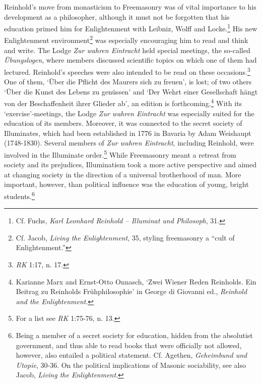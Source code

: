 Reinhold's move from monasticism to Freemasonry was of vital importance to his development as a philosopher, although it must not be forgotten that his education primed him for Enlightenment with Leibniz, Wolff and Locke.\footnote{ Cf. Fuchs, \textit{Karl Leonhard Reinhold {--} Illuminat und Philosoph}, 31.} His new Enlightenment environment\footnote{ Cf. Jacob, \textit{Living the Enlightenment}, 35, styling freemasonry a ``cult of Enlightenment.''} was especially encouraging him to read and think and write. The Lodge \textit{Zur wahren Eintracht} held special meetings, the so{-}called \textit{\"{U}bungslogen}, where members discussed scientific topics on which one of them had lectured. Reinhold's speeches were also intended to be read on these occasions.\footnote{ \textit{RK} 1:17, n. 17. } One of them, `\"{U}ber die Pflicht des Maurers sich zu freuen', is lost; of two others `\"{U}ber die Kunst des Lebens zu gen\"{u}ssen' and `Der Wehrt einer Gesellschaft h\"{a}ngt von der Beschaffenheit ihrer Glieder ab', an edition is forthcoming.\footnote{ Karianne Marx and Ernst{-}Otto Onnasch, `Zwei Wiener Reden Reinholds. Ein Beitrag zu Reinholds Fr\"{u}hphilosophie' in George di Giovanni ed., \textit{Reinhold and the Enlightenment}. } With its `exercise'{-}meetings, the Lodge \textit{Zur wahren Eintracht} was especially suited for the education of its members. Moreover, it was connected to the secret society of Illuminates, which had been established in 1776 in Bavaria by Adam Weishaupt (1748{-}1830). Several members of \textit{Zur wahren Eintracht}, including Reinhold, were involved in the Illuminate order.\footnote{ For a list see \textit{RK} 1:75{-}76, n. 13.} While Freemasonry meant a retreat from society and its prejudices, Illuminatism took a more active perspective and aimed at changing society in the direction of a universal brotherhood of man. More important, however, than political influence was the education of young, bright students.\footnote{ Being a member of a secret society for education, hidden from the absolutist government, and thus able to read books that were officially not allowed, however, also entailed a political statement. Cf. Agethen, \textit{Geheimbund und Utopie}, 30{-}36. On the political implications of Masonic sociability, see also Jacob, \textit{Living the Enlightenment}.} 

